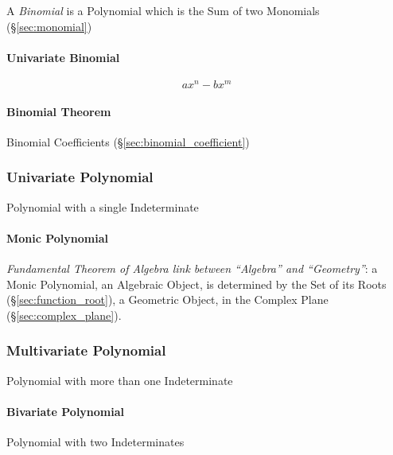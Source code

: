 A \emph{Binomial} is a Polynomial which is the Sum of two Monomials
(\S\ref{sec:monomial})



\paragraph{Univariate Binomial}\label{sec:univariate_binomial}\hfill

\[
  a x^n - b x^m
\]


\paragraph{Binomial Theorem}\label{sec:binomial_theorem}\hfill

Binomial Coefficients (\S\ref{sec:binomial_coefficient})



\subsubsection{Univariate Polynomial}\label{sec:univariate_polynomial}

Polynomial with a single Indeterminate



\paragraph{Monic Polynomial}\label{sec:monic_polynomial}\hfill

\emph{Fundamental Theorem of Algebra link between ``Algebra'' and
  ``Geometry''}: a Monic Polynomial, an Algebraic Object, is determined by the
Set of its Roots (\S\ref{sec:function_root}), a Geometric Object, in the
Complex Plane (\S\ref{sec:complex_plane}).



\subsubsection{Multivariate Polynomial}\label{sec:multivariate_polynomial}

Polynomial with more than one Indeterminate



\paragraph{Bivariate Polynomial}\label{sec:bivariate_polynomial}\hfill

Polynomial with two Indeterminates



